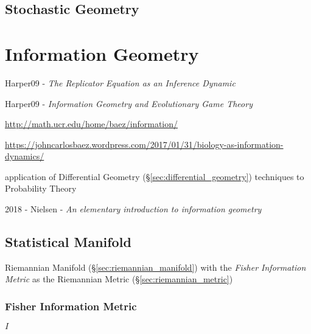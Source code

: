 \subsection{Stochastic Geometry}\label{sec:stochastic_geometry}



\section{Information Geometry}\label{sec:information_geometry}

Harper09 - \emph{The Replicator Equation as an Inference Dynamic}

Harper09 - \emph{Information Geometry and Evolutionary Game Theory}

\url{http://math.ucr.edu/home/baez/information/}

\url{https://johncarlosbaez.wordpress.com/2017/01/31/biology-as-information-dynamics/}

application of Differential Geometry
(\S\ref{sec:differential_geometry}) techniques to Probability Theory

2018 - Nielsen - \emph{An elementary introduction to information geometry}



\subsection{Statistical Manifold}\label{sec:statistical_manifold}

Riemannian Manifold (\S\ref{sec:riemannian_manifold}) with the
\emph{Fisher Information Metric} as the Riemannian Metric
(\S\ref{sec:riemannian_metric})



\subsubsection{Fisher Information Metric}\label{sec:fisher_metric}

$I$

